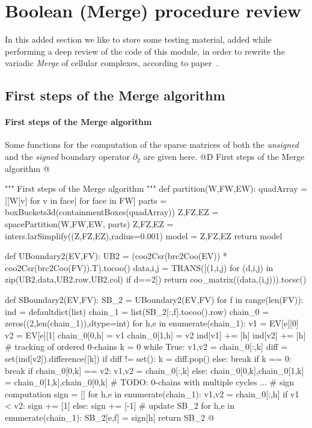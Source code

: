 \documentclass[11pt,oneside]{article}    %
\begin{document}
\section{Boolean (Merge) procedure review}

In this added section we like to store some testing material, added while performing a deep review of the code of this module, in order to rewrite the variadic \emph{Merge} of cellular complexes, according to paper~\cite{2017arXiv170400142P}.

\subsection{First steps of the Merge algorithm}

\paragraph{First steps of the Merge algorithm}
Some functions for the computation of the sparse matrices of both the \emph{unsigned} and the \emph{signed} boundary operator $\partial_2$ are given here.
@D First steps of the Merge algorithm
@{""" First steps of the Merge algorithm """    
def partition(W,FW,EW):
    quadArray = [[W[v] for v in face] for face in FW]
    parts = boxBuckets3d(containmentBoxes(quadArray))
    Z,FZ,EZ = spacePartition(W,FW,EW, parts)
    Z,FZ,EZ = inters.larSimplify((Z,FZ,EZ),radius=0.001)
    model = Z,FZ,EZ
    return model

def UBoundary2(EV,FV):
	UB2 = (coo2Csr(brc2Coo(EV)) * coo2Csr(brc2Coo(FV)).T).tocoo()
	data,i,j = TRANS([(1,i,j) for (d,i,j) in zip(UB2.data,UB2.row,UB2.col) if d==2])
	return coo_matrix((data,(i,j))).tocsc()

def SBoundary2(EV,FV):
	SB_2 = UBoundary2(EV,FV)
	for f in range(len(FV)):
		ind = defaultdict(list)
		chain_1 = list(SB_2[:,f].tocoo().row)
		chain_0 = zeros((2,len(chain_1)),dtype=int)
		for h,e in enumerate(chain_1):
			v1 = EV[e][0]
			v2 = EV[e][1]
			chain_0[0,h] = v1
			chain_0[1,h] = v2
			ind[v1] += [h]
			ind[v2] += [h]
		# tracking of ordered 0-chains
		k = 0
		while True:
			v1,v2 = chain_0[:,k]
			diff = set(ind[v2]).difference([k])
			if diff != set():
				k = diff.pop()
			else: break
			if k == 0: break
			if chain_0[0,k] == v2:
				v1,v2 = chain_0[:,k]
			else:
				chain_0[0,k],chain_0[1,k] = chain_0[1,k],chain_0[0,k]
		# TODO: 0-chains with multiple cycles ...
		# sign computation
		sign = []
		for h,e in enumerate(chain_1):
			v1,v2 = chain_0[:,h]
			if v1 < v2:
				sign += [1]
			else:
				sign += [-1]
		# update SB_2
		for h,e in enumerate(chain_1):
			SB_2[e,f] = sign[h]
	return SB_2
@}
\end{document}
